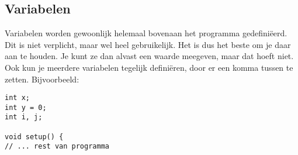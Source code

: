\documentclass[a4paper,11pt]{report}
\begin{document}
\subsection{Variabelen}

Variabelen worden gewoonlijk helemaal bovenaan het programma gedefiniëerd.
Dit is niet verplicht, maar wel heel gebruikelijk.  Het is dus het beste
om je daar aan te houden.  Je kunt ze dan alvast een waarde meegeven, maar
dat hoeft niet.  Ook kun je meerdere variabelen tegelijk definiëren, door
er een komma tussen te zetten.  Bijvoorbeeld:
\begin{verbatim}
int x;
int y = 0;
int i, j;

void setup() {
// ... rest van programma
\end{verbatim}
\end{document}
